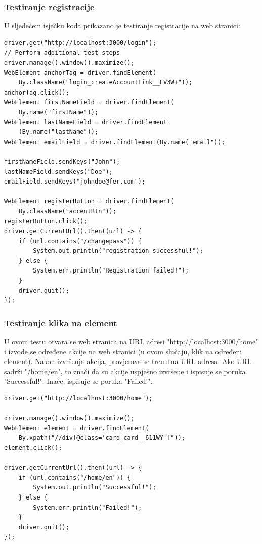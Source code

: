 			\subsubsection{Testiranje registracije}

			U sljedećem isječku koda prikazano je testiranje registracije na web stranici:
			
			\begin{lstlisting}
driver.get("http://localhost:3000/login");
// Perform additional test steps
driver.manage().window().maximize();
WebElement anchorTag = driver.findElement(
	By.className("login_createAccountLink__FV3W+"));
anchorTag.click();
WebElement firstNameField = driver.findElement(
	By.name("firstName"));
WebElement lastNameField = driver.findElement
	(By.name("lastName"));
WebElement emailField = driver.findElement(By.name("email"));

firstNameField.sendKeys("John");
lastNameField.sendKeys("Doe");
emailField.sendKeys("johndoe@fer.com");

WebElement registerButton = driver.findElement(
	By.className("accentBtn"));
registerButton.click();
driver.getCurrentUrl().then((url) -> {
	if (url.contains("/changepass")) {
		System.out.println("registration successful!");
	} else {
		System.err.println("Registration failed!");
	}
	driver.quit();        
});
			\end{lstlisting}

			\subsubsection{Testiranje klika na element}

			U ovom testu otvara se web stranica na URL adresi "http://localhost:3000/home" i izvode se određene akcije na web stranici (u ovom slučaju, klik na određeni element). Nakon izvršenja akcija, provjerava se trenutna URL adresa. Ako URL sadrži "/home/en", to znači da su akcije uspješno izvršene i ispisuje se poruka "Successful!". Inače, ispisuje se poruka "Failed!".

			\begin{lstlisting}
driver.get("http://localhost:3000/home");

driver.manage().window().maximize();
WebElement element = driver.findElement(
	By.xpath("//div[@class='card_card__611WY']"));
element.click();

driver.getCurrentUrl().then((url) -> {
	if (url.contains("/home/en")) {
		System.out.println("Successful!");
	} else {
		System.err.println("Failed!");
	}
	driver.quit();
});
			\end{lstlisting}

